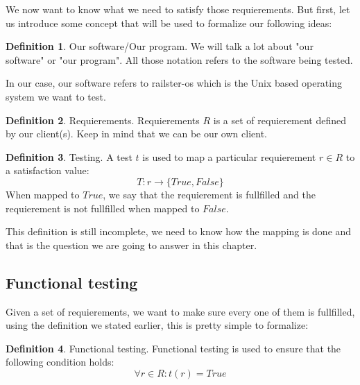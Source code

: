 \documentclass[12pt]{article}
\theoremstyle{definition}
\newtheorem{definition}{Definition}[section]
\theoremstyle{definition}
\theoremstyle{remark}
\begin{document}
We now want to know what we need to satisfy those requierements. But first, let us introduce some concept that will be used to formalize our following ideas:

\theoremstyle{definition}
\begin{definition}{Our software/Our program.} We will talk a lot about "our software" or "our program". All those notation refers to the software being tested.
\end{definition}

In our case, our software refers to railster-os which is the Unix based operating system we want to test.

\theoremstyle{definition}
\begin{definition}{Requierements.} Requierements $R$ is a set of requierement defined by our client(s). Keep in mind that we can be our own client.
\end{definition}

\theoremstyle{definition}\label{def:Testing}
\begin{definition}{Testing.} A test $t$ is used to map a particular requierement $r \in R$ to a satisfaction value:
$$
T: r \to \{True, False\}
$$
When mapped to $True$, we say that the requierement is fullfilled and the requierement is not fullfilled when mapped to $False$.
\end{definition}

This definition is still incomplete, we need to know how the mapping is done and that is the question we are going to answer in this chapter.



\subsection{Functional testing}


Given a set of requierements, we want to make sure every one of them is fullfilled, using the definition we stated earlier, this is pretty simple to formalize:

\theoremstyle{definition}
\begin{definition}{Functional testing.} Functional testing is used to ensure that the following condition holds:
$$\forall r \in R: t(r) = True$$
\end{definition}
\end{document}
